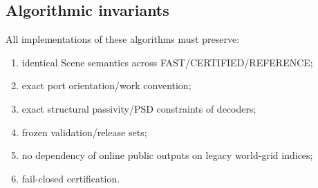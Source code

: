 \subsection{Algorithmic invariants}

All implementations of these algorithms must preserve:
\begin{enumerate}
\item identical Scene semantics across FAST/CERTIFIED/REFERENCE;
\item exact port orientation/work convention;
\item exact structural passivity/PSD constraints of decoders;
\item frozen validation/release sets;
\item no dependency of online public outputs on legacy world-grid indices;
\item fail-closed certification.
\end{enumerate}
